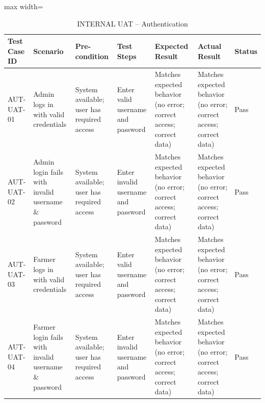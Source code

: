 {	\begin{table}[H]
		\centering
		\caption{INTERNAL UAT – Authentication}
		\renewcommand{\arraystretch}{1.2}
		\begin{adjustbox}{max width=\textwidth}
			\begin{tabular}{p{2cm}p{3cm}p{3cm}p{3cm}p{4cm}p{4cm}p{1.5cm}}
				\toprule
				\textbf{Test Case ID} & \textbf{Scenario} & \textbf{Pre-condition} & \textbf{Test Steps} & \textbf{Expected Result} & \textbf{Actual Result} & \textbf{Status} \\
				\midrule
				AUT-UAT-01 & Admin logs in with valid credentials & System available; user has required access & Enter valid username and password & Matches expected behavior (no error; correct access; correct data) & Matches expected behavior (no error; correct access; correct data) & Pass \\
				AUT-UAT-02 & Admin login fails with invalid username \& password & System available; user has required access & Enter invalid username and password & Matches expected behavior (no error; correct access; correct data) & Matches expected behavior (no error; correct access; correct data) & Pass \\
				AUT-UAT-03 & Farmer logs in with valid credentials & System available; user has required access & Enter valid username and password & Matches expected behavior (no error; correct access; correct data) & Matches expected behavior (no error; correct access; correct data) & Pass \\
				AUT-UAT-04 & Farmer login fails with invalid username \& password & System available; user has required access & Enter invalid username and password & Matches expected behavior (no error; correct access; correct data) & Matches expected behavior (no error; correct access; correct data) & Pass \\
				\bottomrule
			\end{tabular}
		\end{adjustbox}
	\end{table}
	
}
